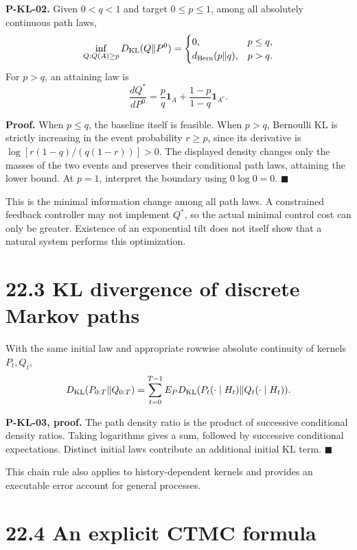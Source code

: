 \documentclass[
  english,
  11pt,
  oneside]{book}
\begin{document}
\hypertarget{p-kl-02}{}\label{p-kl-02}

\textbf{P-KL-02.} Given \(0<q<1\) and target \(0\le p\le1\), among all absolutely continuous path laws, \[\inf_{Q:Q(A)\ge p}D_{\rm KL}(Q\|P^0)
=
\begin{cases}
0,&p\le q,\\
d_{\rm Bern}(p\|q),&p>q.
\end{cases}\] For \(p>q\), an attaining law is \[\frac{dQ^*}{dP^0}
=\frac pq\mathbf1_A+
\frac{1-p}{1-q}\mathbf1_{A^c}.\]

\textbf{Proof.} When \(p\le q\), the baseline itself is feasible. When \(p>q\), Bernoulli KL is strictly increasing in the event probability \(r\ge p\), since its derivative is \(\log[r(1-q)/(q(1-r))]>0\). The displayed density changes only the masses of the two events and preserves their conditional path laws, attaining the lower bound. At \(p=1\), interpret the boundary using \(0\log0=0\). \(\blacksquare\)

This is the minimal information change among all path laws. A constrained feedback controller may not implement \(Q^*\), so the actual minimal control cost can only be greater. Existence of an exponential tilt does not itself show that a natural system performs this optimization.

\section{22.3 KL divergence of discrete Markov paths}\label{kl-divergence-of-discrete-markov-paths}

With the same initial law and appropriate rowwise absolute continuity of kernels \(P_t,Q_t\), \[D_{\rm KL}(P_{0:T}\|Q_{0:T})
=\sum_{t=0}^{T-1}E_P
D_{\rm KL}(P_t(\cdot\mid H_t)\|Q_t(\cdot\mid H_t)).\]

\hypertarget{p-kl-03}{}\label{p-kl-03}

\textbf{P-KL-03, proof.} The path density ratio is the product of successive conditional density ratios. Taking logarithms gives a sum, followed by successive conditional expectations. Distinct initial laws contribute an additional initial KL term. \(\blacksquare\)

This chain rule also applies to history-dependent kernels and provides an executable error account for general processes.

\section{22.4 An explicit CTMC formula}\label{an-explicit-ctmc-formula}
\end{document}
